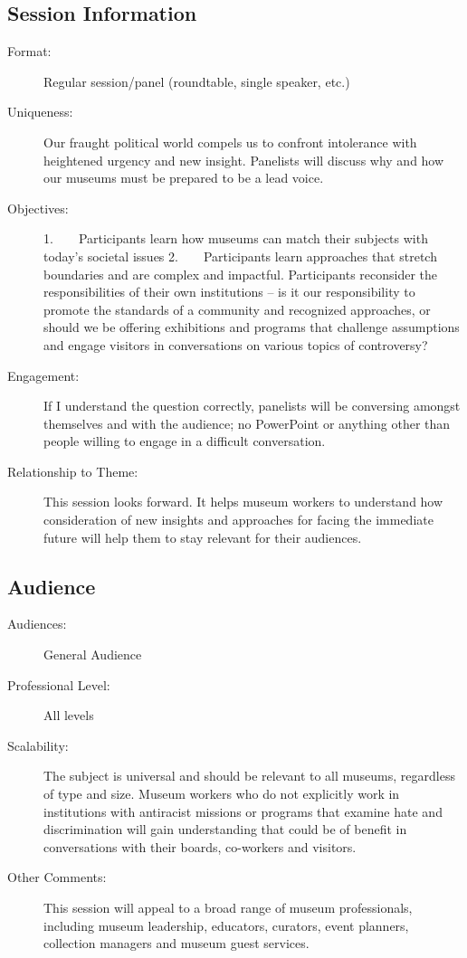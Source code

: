 \documentclass{report}
\begin{document}
              \subsection*{Session Information}
                \begin{description}
                  \item [Format:] Regular session/panel (roundtable, single speaker, etc.)
							    
							    \item [Uniqueness:]Our fraught political world compels us to confront intolerance with heightened urgency and new insight. Panelists will discuss why and how our museums must be prepared to be a lead voice.
							    \item [Objectives:]1.    Participants learn how museums can match their subjects with today’s societal issues
2.    Participants learn approaches that stretch boundaries and are complex and impactful.
Participants reconsider the responsibilities of their own institutions -- is it our responsibility to promote the standards of a community and recognized approaches, or should we be offering exhibitions and programs that challenge assumptions and engage visitors in conversations on various topics of controversy?
							    \item [Engagement:]If I understand the question correctly, panelists will be conversing amongst themselves and with the audience; no PowerPoint or anything other than people willing to engage in a difficult conversation.
							    \item [Relationship to Theme:]This session looks forward. It helps museum workers to understand how consideration of new insights and approaches for facing the immediate future will help them to stay relevant for their audiences.
							    
                \end{description}
              \subsection*{Audience}
                \begin{description}
                  \item [Audiences:]General Audience~
                  \item[Professional Level:]All levels~
                \item[Scalability:] The subject is universal and should be relevant to all museums, regardless of type and size. Museum workers who do not explicitly work in institutions with antiracist missions or programs that examine hate and discrimination will gain understanding that could be of benefit in conversations with their boards, co-workers and visitors. 

							
              \item[Other Comments:] This session will appeal to a broad range of museum professionals, including museum leadership, educators, curators, event planners, collection managers and museum guest services.
              \end{description}
\end{document}
